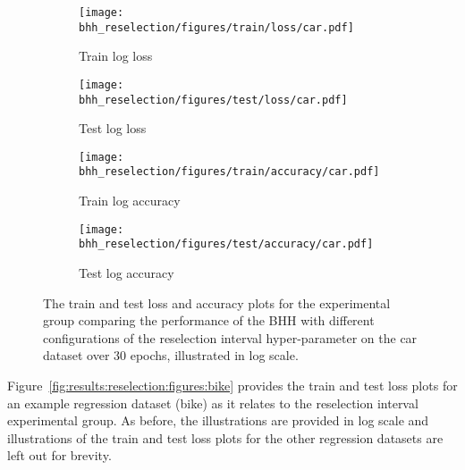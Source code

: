 \begin{figure}[htbp]
      \begin{subfigure}{0.5\textwidth}
            \centering
            \texttt{[image: bhh\_reselection/figures/train/loss/car.pdf]}
            \caption{Train log loss}
            \label{fig:results:reselection:figures:loss:train:car}
      \end{subfigure}
      \begin{subfigure}{0.5\textwidth}
            \centering
            \texttt{[image: bhh\_reselection/figures/test/loss/car.pdf]}
            \caption{Test log loss}
            \label{fig:results:reselection:figures:loss:test:car}
      \end{subfigure}
      \par\bigskip
      \begin{subfigure}{0.5\textwidth}
            \centering
            \texttt{[image: bhh\_reselection/figures/train/accuracy/car.pdf]}
            \caption{Train log accuracy}
            \label{fig:results:reselection:figures:accuracy:train:car}
      \end{subfigure}
      \begin{subfigure}{0.5\textwidth}
            \centering
            \texttt{[image: bhh\_reselection/figures/test/accuracy/car.pdf]}
            \caption{Test log accuracy}
            \label{fig:results:reselection:figures:accuracy:test:car}
      \end{subfigure}
      \par\bigskip
      \caption{The train and test loss and accuracy plots for the experimental group comparing the performance of the \acs{BHH} with different configurations of the reselection interval hyper-parameter on the car dataset over 30 epochs, illustrated in log scale.}
      \label{fig:results:reselection:figures:car}
\end{figure}

Figure~\ref{fig:results:reselection:figures:bike} provides the train and test loss plots for an example regression dataset (bike) as it relates to the reselection interval experimental group. As before, the illustrations are provided in log scale and illustrations of the train and test loss plots for the other regression datasets are left out for brevity.

